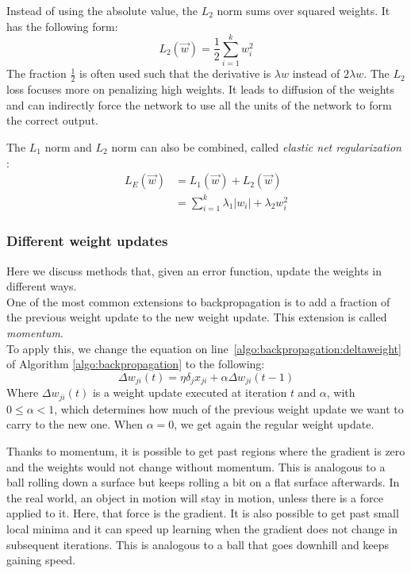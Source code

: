 Instead of using the absolute value, the $L_2$ norm sums over squared weights. It has the following form:
\begin{equation}
    L_2(\overrightarrow{w}) = \frac{1}{2} \sum_{i=1}^k w_i^2
\end{equation}
The fraction $\frac{1}{2}$ is often used such that the derivative is $\lambda w$ instead of $2 \lambda w$. The $L_2$ loss focuses more on penalizing high weights.
It leads to diffusion of the weights and can indirectly force the network to use all the units of the network to form the correct output.

The $L_1$ norm and $L_2$ norm can also be combined, called \textit{elastic net regularization} \parencite{hastie2012ElasticNet}:
\begin{align}
    L_E (\overrightarrow{w}) &= L_1(\overrightarrow{w}) + L_2(\overrightarrow{w})\\
    &= \sum_{i=1}^k \lambda_1 \vert w_i \vert + \lambda_2 w_i^2
\end{align}


\subsubsection{Different weight updates} %
\label{ssub:different_weight_updates}
Here we discuss methods that, given an error function, update the weights in different ways.\\

One of the most common extensions to backpropagation is to add a fraction of the previous weight update to the new weight update. This extension is called \textit{momentum}.\\
To apply this, we change the equation on line~\ref{algo:backpropagation:deltaweight} of Algorithm \ref{algo:backpropagation} to the following:
\begin{equation}
    \Delta w_{ji}(t) = \eta \delta_j x_{ji} + \alpha \Delta w_{ji}(t-1)
\end{equation}
Where $\Delta w_{ji}(t)$ is a weight update executed at iteration $t$ and $\alpha$, with $0 \le \alpha < 1$, which determines how much of the previous weight update we want to carry to the new one. When $\alpha = 0$, we get again the regular weight update.

Thanks to momentum, it is possible to get past regions where the gradient is zero and the weights would not change without momentum.
This is analogous to a ball rolling down a surface but keeps rolling a bit on a flat surface afterwards.
In the real world, an object in motion will stay in motion, unless there is a force applied to it.
Here, that force is the gradient.
It is also possible to get past small local minima and it can speed up learning when the gradient does not change in subsequent iterations.
This is analogous to a ball that goes downhill and keeps gaining speed.\\

